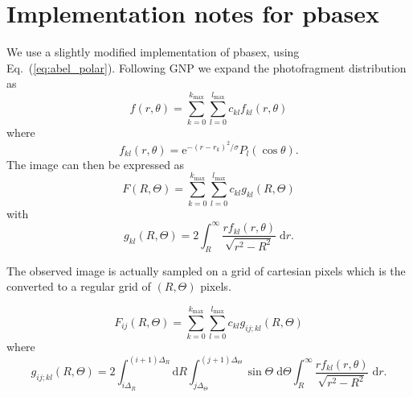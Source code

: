 \documentclass{article}
\renewcommand{\eqref}[1]{Eq.~(\ref{#1})}
\renewcommand{\exp}[1]{\ensuremath{\mathrm{e}^{#1}}}
\begin{document}
\section{Implementation notes for pbasex}
We use a slightly modified implementation of pbasex, using
\eqref{eq:abel_polar}. Following GNP we expand the photofragment distribution
as 
\begin{equation}
  f(r,\theta)=
  \sum_{k=0}^{k_\mathrm{max}}
  \sum_{l=0}^{l_\mathrm{max}}
  c_{kl}f_{kl}(r,\theta)
\end{equation}
where
\begin{equation}
  f_{kl}(r,\theta)=
  \exp{-(r-r_k)^2/\sigma}P_l(\cos\theta).
\end{equation}
The image can then be expressed as
\begin{equation}
  F(R, \Theta)=
  \sum_{k=0}^{k_\mathrm{max}}
  \sum_{l=0}^{l_\mathrm{max}}
  c_{kl}g_{kl}(R,\Theta)
\end{equation}
with
\begin{equation}
  g_{kl}(R,\Theta)=
  2\int_{R}^\infty
  \frac{rf_{kl}(r, \theta)}{\sqrt{r^2-R^2}}\;\mathrm{d}r.
\end{equation}

The observed image is actually sampled on a grid of cartesian pixels which is
the converted to a regular grid of $(R, \Theta)$ pixels.

\begin{equation}
  F_{ij}(R, \Theta)=
  \sum_{k=0}^{k_\mathrm{max}}
  \sum_{l=0}^{l_\mathrm{max}}
  c_{kl}g_{ij;kl}(R,\Theta)
\end{equation}
where
\begin{equation}
  g_{ij;kl}(R,\Theta)=
  2
  \int_{i\Delta_R}^{(i+1)\Delta_R}\mathrm{d}R
  \int_{j\Delta_\Theta}^{(j+1)\Delta_\Theta}\sin\Theta\;\mathrm{d}\Theta
  \int_{R}^\infty
  \frac{rf_{kl}(r, \theta)}{\sqrt{r^2-R^2}}\;\mathrm{d}r.
\end{equation}
\end{document}
